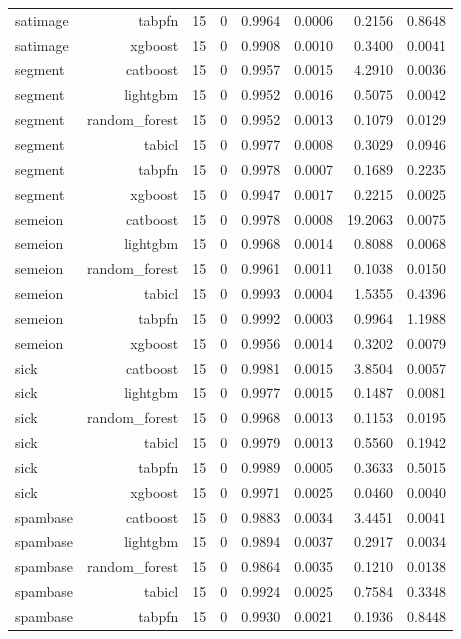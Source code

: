 \begin{table}[htbp]
\begin{tabular}{lrrrrrrr}
satimage & tabpfn & 15 & 0 & 0.9964 & 0.0006 & 0.2156 & 0.8648 \\
satimage & xgboost & 15 & 0 & 0.9908 & 0.0010 & 0.3400 & 0.0041 \\
segment & catboost & 15 & 0 & 0.9957 & 0.0015 & 4.2910 & 0.0036 \\
segment & lightgbm & 15 & 0 & 0.9952 & 0.0016 & 0.5075 & 0.0042 \\
segment & random\_forest & 15 & 0 & 0.9952 & 0.0013 & 0.1079 & 0.0129 \\
segment & tabicl & 15 & 0 & 0.9977 & 0.0008 & 0.3029 & 0.0946 \\
segment & tabpfn & 15 & 0 & 0.9978 & 0.0007 & 0.1689 & 0.2235 \\
segment & xgboost & 15 & 0 & 0.9947 & 0.0017 & 0.2215 & 0.0025 \\
semeion & catboost & 15 & 0 & 0.9978 & 0.0008 & 19.2063 & 0.0075 \\
semeion & lightgbm & 15 & 0 & 0.9968 & 0.0014 & 0.8088 & 0.0068 \\
semeion & random\_forest & 15 & 0 & 0.9961 & 0.0011 & 0.1038 & 0.0150 \\
semeion & tabicl & 15 & 0 & 0.9993 & 0.0004 & 1.5355 & 0.4396 \\
semeion & tabpfn & 15 & 0 & 0.9992 & 0.0003 & 0.9964 & 1.1988 \\
semeion & xgboost & 15 & 0 & 0.9956 & 0.0014 & 0.3202 & 0.0079 \\
sick & catboost & 15 & 0 & 0.9981 & 0.0015 & 3.8504 & 0.0057 \\
sick & lightgbm & 15 & 0 & 0.9977 & 0.0015 & 0.1487 & 0.0081 \\
sick & random\_forest & 15 & 0 & 0.9968 & 0.0013 & 0.1153 & 0.0195 \\
sick & tabicl & 15 & 0 & 0.9979 & 0.0013 & 0.5560 & 0.1942 \\
sick & tabpfn & 15 & 0 & 0.9989 & 0.0005 & 0.3633 & 0.5015 \\
sick & xgboost & 15 & 0 & 0.9971 & 0.0025 & 0.0460 & 0.0040 \\
spambase & catboost & 15 & 0 & 0.9883 & 0.0034 & 3.4451 & 0.0041 \\
spambase & lightgbm & 15 & 0 & 0.9894 & 0.0037 & 0.2917 & 0.0034 \\
spambase & random\_forest & 15 & 0 & 0.9864 & 0.0035 & 0.1210 & 0.0138 \\
spambase & tabicl & 15 & 0 & 0.9924 & 0.0025 & 0.7584 & 0.3348 \\
spambase & tabpfn & 15 & 0 & 0.9930 & 0.0021 & 0.1936 & 0.8448 \\

\end{tabular}
\end{table}

